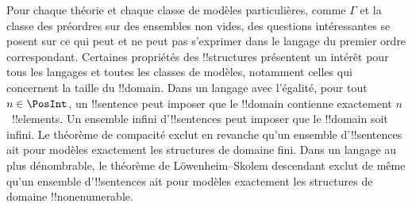 \documentclass[../../../include/open-logic-section]{subfiles}
\begin{document}
Pour chaque théorie et chaque classe de modèles particulières, comme
$\Gamma$ et la classe des préordres sur des ensembles non vides,
des questions intéressantes
se posent sur ce qui peut et ne peut pas s'exprimer dans le langage du
premier ordre correspondant. Certaines propriétés des !!{structure}s
présentent un intérêt pour tous les langages et toutes les classes de
modèles, notamment celles qui concernent la taille du !!{domain}.
Dans un langage avec l'égalité, pour tout~$n \in \PosInt$, un
!!{sentence} peut imposer que le !!{domain} contienne exactement
$n$~!!{element}s. Un ensemble infini d'!!{sentence}s peut imposer
que le !!{domain} soit infini. Le théorème de compacité exclut en
revanche qu'un ensemble d'!!{sentence}s ait pour modèles exactement
les structures de domaine fini. Dans un langage au plus dénombrable,
le théorème de L\"owenheim--Skolem descendant exclut de même qu'un
ensemble d'!!{sentence}s ait pour modèles exactement les structures
de domaine !!{nonenumerable}.
\end{document}
